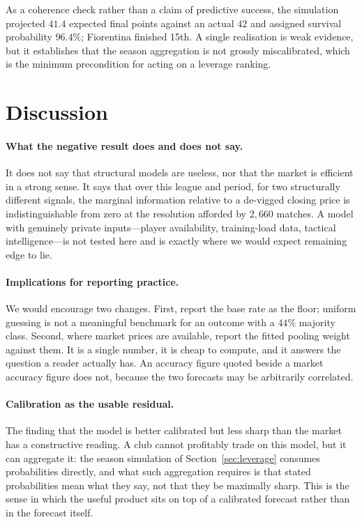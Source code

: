 \documentclass[11pt]{article}
\begin{document}
As a coherence check rather than a claim of predictive success, the simulation
projected $41.4$ expected final points against an actual $42$ and assigned
survival probability $96.4\%$; Fiorentina finished 15th. A single realisation
is weak evidence, but it establishes that the season aggregation is not grossly
miscalibrated, which is the minimum precondition for acting on a leverage
ranking.

\section{Discussion}
\label{sec:discussion}

\paragraph{What the negative result does and does not say.} It does not say that
structural models are useless, nor that the market is efficient in a strong
sense. It says that over this league and period, for two structurally different
signals, the marginal information relative to a de-vigged closing price is
indistinguishable from zero at the resolution afforded by $2{,}660$ matches. A
model with genuinely private inputs---player availability, training-load data,
tactical intelligence---is not tested here and is exactly where we would expect
remaining edge to lie.

\paragraph{Implications for reporting practice.} We would encourage two changes.
First, report the base rate as the floor; uniform guessing is not a meaningful
benchmark for an outcome with a $44\%$ majority class. Second, where market
prices are available, report the fitted pooling weight against them. It is a
single number, it is cheap to compute, and it answers the question a reader
actually has. An accuracy figure quoted beside a market accuracy figure does
not, because the two forecasts may be arbitrarily correlated.

\paragraph{Calibration as the usable residual.} The finding that the model is
better calibrated but less sharp than the market has a constructive reading. A
club cannot profitably trade on this model, but it can aggregate it: the season
simulation of Section~\ref{sec:leverage} consumes probabilities directly, and
what such aggregation requires is that stated probabilities mean what they say,
not that they be maximally sharp. This is the sense in which the useful product
sits on top of a calibrated forecast rather than in the forecast itself.
\end{document}
